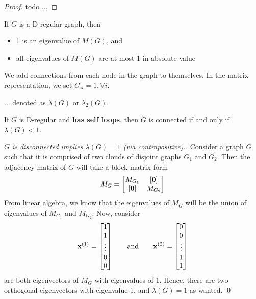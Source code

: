 \begin{proof}
	todo ... 
\end{proof}

\begin{proposition}
	If $G$ is a D-regular graph, then
	\begin{itemize}
		\item 1 is an eigenvalue of $M(G)$, and 
		\item all eigenvalues of $M(G)$ are at most 1 in absolute value
	\end{itemize}
\end{proposition}

\begin{definition}
	We add connections from each node in the graph to themselves. In the matrix representation, we set $G_{ii} = 1, \forall i$. 
\end{definition}

\begin{definition}
	... denoted as $\lambda(G)$ or $\lambda_2(G)$. 
\end{definition}

\begin{lemma}
	If $G$ is D-regular and \textbf{has self loops}, then $G$ is connected if and only if $\lambda(G) < 1$.
\end{lemma}

\begin{proof} 
[$G$ is disconnected implies $\lambda(G) = 1$ (via contrapositive).] 
Consider a graph $G$ such that it is comprised of two clouds of disjoint graphs $G_1$ and $G_2$. Then the adjacency matrix of $G$ will take a block matrix form
\begin{equation}
	M_G = \begin{bmatrix}
		M_{G_1} & [\bzero ]  \\
		[\bzero ] & M_{G_2}
	\end{bmatrix}
\end{equation}
From linear algebra, we know that the eigenvalues of $M_G$ will be the union of eigenvalues of $M_{G_1}$ and $M_{G_2}$. Now, consider
\begin{equation}
	\mathbf{x}^{(1)} = 
	\begin{bmatrix}
		1 \\ 1 \\ \vdots \\ 0 \\ 0
	\end{bmatrix} 
	\quad \quad \text{and} \quad \quad
	\mathbf{x}^{(2)} = 
	\begin{bmatrix}
		0 \\ 0 \\ \vdots \\ 1 \\ 1
	\end{bmatrix}
\end{equation}
are both eigenvectors of $M_G$ with eigenvalues of 1. Hence, there are two orthogonal eigenvectors with eigenvalue 1, and $\lambda(G) = 1$ as wanted. 
\qed

\end{proof}

